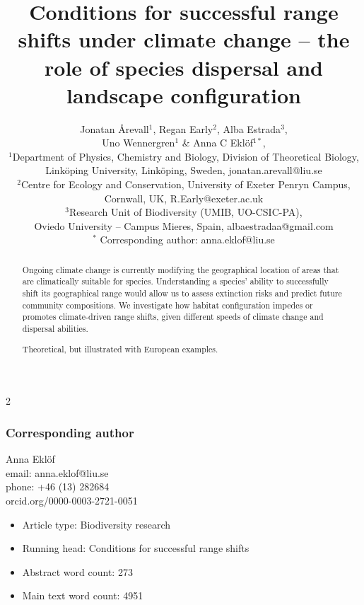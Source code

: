 \documentclass[12pt,pdftex]{article}
\date{}
\title{Conditions for successful range shifts under climate change -- the role of species dispersal and landscape configuration}
\author{Jonatan \r{A}revall$^{1}$,  Regan Early$^{2}$, Alba Estrada$^{3}$, \\ Uno Wennergren$^{1}$ \& Anna C Ekl\"{o}f$^{1*}$,\\
 $^1$\small Department of Physics, Chemistry and Biology, Division of Theoretical Biology,\\ \small  Link\"{o}ping University, Link\"{o}ping, Sweden, jonatan.arevall@liu.se\\
 $^2$\small Centre for Ecology and Conservation, University of Exeter Penryn Campus,\\ \small Cornwall, UK, R.Early@exeter.ac.uk\\
 $^3$\small Research Unit of Biodiversity (UMIB, UO-CSIC-PA), \\ \small Oviedo University – Campus Mieres, Spain, albaestradaa@gmail.com \\
  $^*$ \small Corresponding author: anna.eklof@liu.se\\
}
\begin{document}
\linenumbers
\maketitle
\baselineskip 18pt
\begin{spacing}{2}

\subsubsection*{Corresponding author}
Anna Ekl\"{o}f\\
email: anna.eklof@liu.se\\
phone: +46 (13) 282684\\
orcid.org/0000-0003-2721-0051\\


%

\clearpage

\begin{itemize}
\item Article type: Biodiversity research
\item Running head: Conditions for successful range shifts
\item Abstract word count: 273
\item Main text word count: 4951 %
\end{itemize}

\clearpage


\begin{abstract}
 Ongoing climate change is currently modifying the geographical location of areas that are climatically suitable for species. Understanding a species' ability to successfully shift its geographical range would allow us to assess extinction risks and predict future community compositions. We investigate how habitat configuration impedes or promotes climate-driven range shifts, given different speeds of climate change and dispersal abilities.

Theoretical, but illustrated with European examples.


\end{abstract}
\end{spacing}
\end{document}
